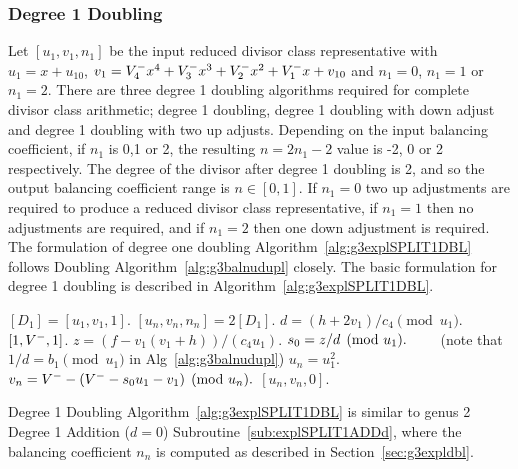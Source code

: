 \subsubsection{Degree 1 Doubling}
Let $[u_1,v_1,n_1]$ be the input reduced divisor class representative with $u_1 = x +
u_{10}$, $v_1 = V^{-}_4x^4 + V^{-}_3x^3 + V^{-}_2x^2 + V^{-}_1x + v_{10}$ and $n_1 = 0$,
$n_1 = 1$ or $n_1 = 2$.  There are three degree 1 doubling algorithms required
for complete divisor class arithmetic; degree 1 doubling, degree 1 doubling with
down adjust and degree 1 doubling with two up adjusts. Depending on the input
balancing coefficient, if $n_1$ is 0,1 or 2, the resulting $n = 2n_1 - 2$ value
is -2, 0 or 2 respectively. The degree of the divisor after degree 1 doubling is
2, and so the output balancing coefficient range is $n \in [0,1]$. If $n_1 = 0$
two up adjustments are required to produce a reduced divisor class
representative, if $n_1 = 1$ then no adjustments are required, and if $n_1 = 2$
then one down adjustment is required. The formulation of degree one doubling
Algorithm~\ref{alg:g3explSPLIT1DBL} follows Doubling
Algorithm~\ref{alg:g3balnudupl} closely. The basic formulation for degree 1
doubling is described in Algorithm~\ref{alg:g3explSPLIT1DBL}. \vspace{10pt}
\begin{algorithm}[htbp]
\caption{Genus 3 Split Model Degree 1 Doubling\label{alg:g3explSPLIT1DBL}}
\begin{algorithmic} [1]
\Require $[D_1] = [u_1,v_1,1]$.  \smallskip
\Ensure $[u_n,v_n,n_n] = 2[D_1]$.
\algrule
\State $d = (h + 2v_1)/c_4 \pmod{u_1}$.
 \Return $[1,V^{-},1]$.
\EndIf
\State $z = (f - v_1(v_1 + h))/(c_4u_1)$.
\State $s_0 = z/d \pmod{u_1}. \quad\quad$ (note that $1/d = b_1 \pmod{u_1}$ in Alg~\ref{alg:g3balnudupl})
\State $u_n = u_1^2$.
\State $v_n = V^{-} - (V^{-} -s_0u_1 - v_1)  \pmod{u_n}.$
\State \Return $[u_n,v_n,0]$.
\end{algorithmic}
\end{algorithm}
Degree 1 Doubling Algorithm~\ref{alg:g3explSPLIT1DBL} is similar to 
genus 2 Degree 1 Addition ($d=0$) Subroutine~\ref{sub:explSPLIT1ADDd}, where the
balancing coefficient $n_n$ is computed as described in
Section~\ref{sec:g3expldbl}. 


